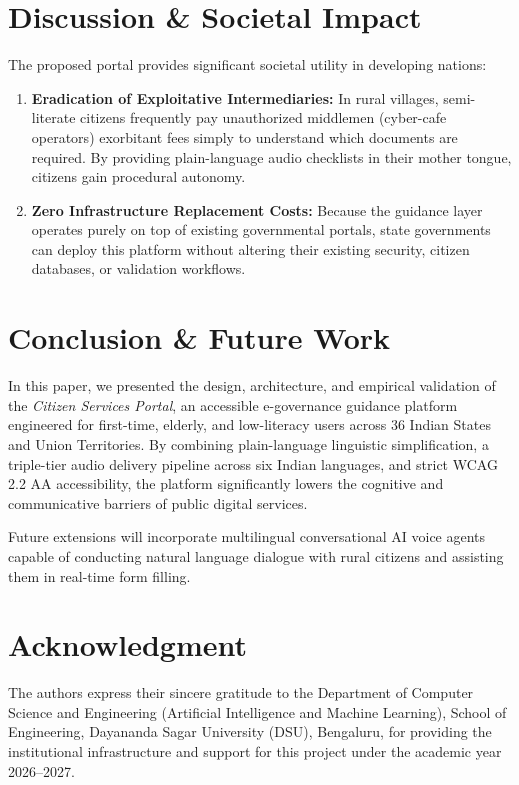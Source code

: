 \documentclass[conference]{IEEEtran}
\begin{document}
\section{Discussion \& Societal Impact}
The proposed portal provides significant societal utility in developing nations:
\begin{enumerate}
    \item \textbf{Eradication of Exploitative Intermediaries:} In rural villages, semi-literate citizens frequently pay unauthorized middlemen (cyber-cafe operators) exorbitant fees simply to understand which documents are required. By providing plain-language audio checklists in their mother tongue, citizens gain procedural autonomy.
    \item \textbf{Zero Infrastructure Replacement Costs:} Because the guidance layer operates purely on top of existing governmental portals, state governments can deploy this platform without altering their existing security, citizen databases, or validation workflows.
\end{enumerate}

\section{Conclusion \& Future Work}
In this paper, we presented the design, architecture, and empirical validation of the \textit{Citizen Services Portal}, an accessible e-governance guidance platform engineered for first-time, elderly, and low-literacy users across 36 Indian States and Union Territories. By combining plain-language linguistic simplification, a triple-tier audio delivery pipeline across six Indian languages, and strict WCAG 2.2 AA accessibility, the platform significantly lowers the cognitive and communicative barriers of public digital services.

Future extensions will incorporate multilingual conversational AI voice agents capable of conducting natural language dialogue with rural citizens and assisting them in real-time form filling.

\section*{Acknowledgment}
The authors express their sincere gratitude to the Department of Computer Science and Engineering (Artificial Intelligence and Machine Learning), School of Engineering, Dayananda Sagar University (DSU), Bengaluru, for providing the institutional infrastructure and support for this project under the academic year 2026--2027.



\end{document}
